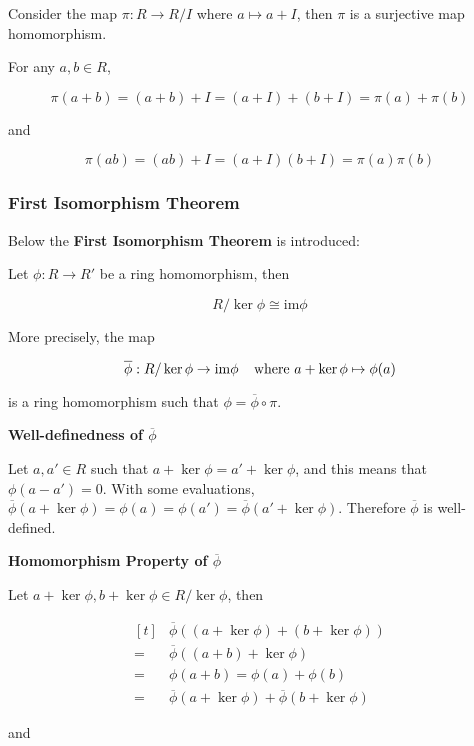 \documentclass[a4paper,12pt]{article}
\begin{document}
\begin{pst}
  Consider the map $\pi:R\to R/I$ where $a\mapsto a+I$, then $\pi$ is a surjective map homomorphism.\n

  \prf For any $a,b\in R$,

  $$\pi(a+b)=(a+b)+I=(a+I)+(b+I)=\pi(a)+\pi(b)$$\s

  and

  $$\pi(ab)=(ab)+I=(a+I)(b+I)=\pi(a)\pi(b)$$
\end{pst}

\subsubsection{First Isomorphism Theorem}
Below the \textbf{First Isomorphism Theorem} is introduced:\n

\begin{thm}
  Let $\phi:R\to R'$ be a ring homomorphism, then

  $$R/\ker\phi\cong\mathrm{im}\phi$$\s

  More precisely, the map

  $$\overline{\phi}:R/\ker\phi\to\mathrm{im}\phi\;\;\;\;\text{where }a+\ker\phi\mapsto\phi(a)$$\s

  is a ring homomorphism such that $\phi=\overline{\phi}\circ\pi$.\n

  \prf \begin{alist}
    \item \textbf{Well-definedness of $\overline{\phi}$}\n

    Let $a,a'\in R$ such that $a+\ker\phi=a'+\ker\phi$, and this means that $\phi(a-a')=0$. With some evaluations, $\overline{\phi}(a+\ker\phi)=\phi(a)=\phi(a')=\overline{\phi}(a'+\ker\phi)$. Therefore $\overline{\phi}$ is well-defined.

    \item \textbf{Homomorphism Property of $\overline{\phi}$}\n

    Let $a+\ker\phi,b+\ker\phi\in R/\ker\phi$, then

    $$\begin{aligned}[t]
      &\overline{\phi}((a+\ker\phi)+(b+\ker\phi))\\
      =&\overline{\phi}((a+b)+\ker\phi)\\
      =&\phi(a+b)=\phi(a)+\phi(b)\\
      =&\overline{\phi}(a+\ker\phi)+\overline{\phi}(b+\ker\phi)
    \end{aligned}$$\s

    and


\end{alist}
\end{thm}
\end{document}
